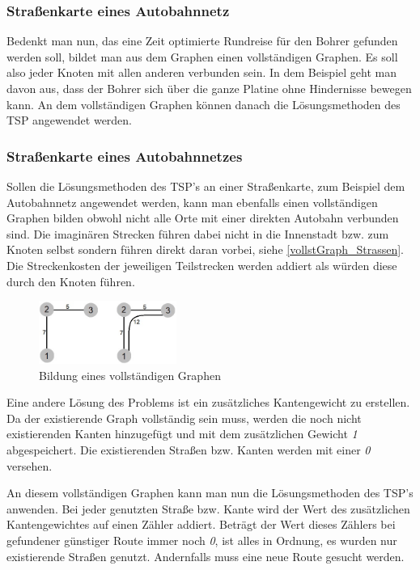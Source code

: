 \documentclass{article}
\begin{document}
\subsubsection{Straßenkarte eines Autobahnnetz}
Bedenkt man nun, das eine Zeit optimierte Rundreise für den Bohrer gefunden werden soll, bildet man aus dem Graphen einen vollständigen Graphen. Es soll also jeder Knoten mit allen anderen verbunden sein. In dem Beispiel geht man davon aus, dass der Bohrer sich über die ganze Platine ohne Hindernisse bewegen kann. An dem vollständigen Graphen können danach die Lösungsmethoden des TSP angewendet werden.


\subsubsection{Straßenkarte eines Autobahnnetzes}

Sollen die Lösungsmethoden des TSP's an einer Straßenkarte, zum Beispiel dem Autobahnnetz angewendet werden, kann man ebenfalls einen vollständigen Graphen bilden obwohl nicht alle Orte mit einer direkten Autobahn verbunden sind. Die imaginären Strecken führen dabei nicht in die Innenstadt bzw. zum Knoten selbst sondern führen direkt daran vorbei, siehe \autoref{vollstGraph_Strassen}. Die Streckenkosten der jeweiligen Teilstrecken werden addiert als würden diese durch den Knoten führen.

\begin{figure}[h]
	\centering
	\includegraphics[width=0.4\textwidth]{vollstGraph_Strassen.jpg}
	\caption{Bildung eines vollständigen Graphen}
	\label{vollstGraph_Strassen}
\end{figure}

Eine andere Lösung des Problems ist ein zusätzliches Kantengewicht zu erstellen. Da der existierende Graph vollständig sein muss, werden die noch nicht existierenden Kanten hinzugefügt und mit dem zusätzlichen Gewicht \textit{1} abgespeichert. Die existierenden Straßen bzw. Kanten werden mit einer \textit{0} versehen.

An diesem vollständigen Graphen kann man nun die Lösungsmethoden des TSP's anwenden. Bei jeder genutzten Straße bzw. Kante wird der Wert des zusätzlichen Kantengewichtes auf einen Zähler addiert. Beträgt der Wert dieses Zählers bei gefundener günstiger Route immer noch \textit{0}, ist alles in Ordnung, es wurden nur existierende Straßen genutzt. Andernfalls muss eine neue Route gesucht werden.
\end{document}
